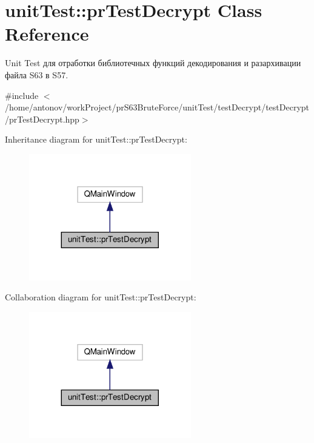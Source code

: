 \hypertarget{classunit_test_1_1pr_test_decrypt}{}\section{unit\+Test\+:\+:pr\+Test\+Decrypt Class Reference}
\label{classunit_test_1_1pr_test_decrypt}


Unit Test для отработки библиотечных функций декодирования и разархивации файла S63 в S57.  




{\ttfamily \#include $<$/home/antonov/work\+Project/pr\+S63\+Brute\+Force/unit\+Test/test\+Decrypt/test\+Decrypt/pr\+Test\+Decrypt.\+hpp$>$}



Inheritance diagram for unit\+Test\+:\+:pr\+Test\+Decrypt\+:\nopagebreak
\begin{figure}[H]
\begin{center}
\leavevmode
\includegraphics[width=200pt]{classunit_test_1_1pr_test_decrypt__inherit__graph}
\end{center}
\end{figure}


Collaboration diagram for unit\+Test\+:\+:pr\+Test\+Decrypt\+:\nopagebreak
\begin{figure}[H]
\begin{center}
\leavevmode
\includegraphics[width=200pt]{classunit_test_1_1pr_test_decrypt__coll__graph}
\end{center}
\end{figure}

